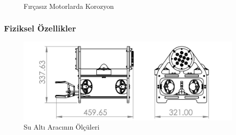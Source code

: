 \documentclass[12pt]{article}
\begin{document}
\begin{figure}[hbt!]%
    \centering
    \qquad
    \caption{Fırçasız Motorlarda Korozyon}%
    \label{fig:korozyon}%
\end{figure}



\newpage
\subsubsection{Fiziksel Özellikler}

\begin{figure}[hbt!]
\centering
\includegraphics[width=1\linewidth]{images/specs.jpg}
\caption{Su Altı Aracının Ölçüleri}
\label{fig:technicaldrawing}
\end{figure}
\end{document}
